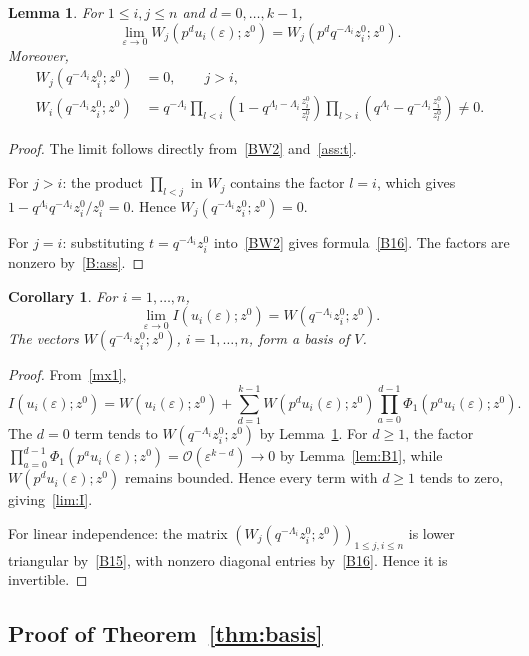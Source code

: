 \documentclass[12pt]{amsart}
\newtheorem{cor}[thm]{Corollary}
\newtheorem{lem}[thm]{Lemma}
\theoremstyle{definition} %
\numberwithin{equation}{section}
\theoremstyle{definition}
\let\mc\mathcal
\let\eps\varepsilon
\let\La\Lambda
\let\geq\geqslant
\let\leq\leqslant
\begin{document}
\begin{lem}
\label{lem:B2}
For $1\leq i,j\leq n$ and $d=0,\dots,k-1$,
\[
\lim_{\eps\to 0} W_j(p^d u_i(\eps);z^0)
=
W_j(p^d q^{-\La_i}z_i^0;z^0).
\]
Moreover,
\begin{align}
W_j(q^{-\La_i}z_i^0;z^0)
&=0,
\qquad
j>i,
\label{B15}
\\
W_i(q^{-\La_i}z_i^0;z^0)
&=
q^{-\La_i}
\prod_{l<i}\!\left(1-q^{\La_l-\La_i}\frac{z_i^0}{z_l^0}\right)
\prod_{l>i}\!\left(q^{\La_l}-q^{-\La_i}\frac{z_i^0}{z_l^0}\right)
\ne0.
\label{B16}
\end{align}
\end{lem}

\begin{proof}
The limit follows directly from~\eqref{BW2} and~\eqref{ass:t}.

For $j>i$: the product $\prod_{l<j}$ in $W_j$ contains the factor
$l=i$, which gives $1-q^{\La_i}q^{-\La_i}z_i^0/z_i^0=0$.
Hence $W_j(q^{-\La_i}z_i^0;z^0)=0$.

For $j=i$: substituting $t=q^{-\La_i}z_i^0$ into~\eqref{BW2} gives
formula~\eqref{B16}. The factors are nonzero
by~\eqref{B:ass}.
\end{proof}

\begin{cor}
\label{cor:lim}
For $i=1,\dots,n$,
\begin{equation}
\label{lim:I}
\lim_{\eps\to 0} I(u_i(\eps);z^0)
=
W(q^{-\La_i}z_i^0;z^0).
\end{equation}
The vectors $W(q^{-\La_i}z_i^0;z^0)$, $i=1,\dots,n$, form a basis of $V$.
\end{cor}

\begin{proof}
From~\eqref{mx1},
\[
I(u_i(\eps);z^0)
=
W(u_i(\eps);z^0)
+
\sum_{d=1}^{k-1}
W(p^d u_i(\eps);z^0)
\prod_{a=0}^{d-1}\Phi_1(p^a u_i(\eps);z^0).
\]
The $d=0$ term tends to $W(q^{-\La_i}z_i^0;z^0)$ by
Lemma~\ref{lem:B2}. For $d\geq1$, the factor
\\
$\prod_{a=0}^{d-1}\Phi_1(p^a u_i(\eps);z^0)=\mc O(\eps^{k-d})\to0$
by Lemma~\ref{lem:B1}, while $W(p^d u_i(\eps);z^0)$ remains bounded.
Hence every term with $d\geq1$ tends to zero, giving~\eqref{lim:I}.

For linear independence: the matrix
$(W_j(q^{-\La_i}z_i^0;z^0))_{1\leq j,i\leq n}$
is lower triangular by~\eqref{B15}, with nonzero diagonal entries
by~\eqref{B16}. Hence it is invertible.
\end{proof}
\subsection{Proof of Theorem~\ref{thm:basis}}
\end{document}
